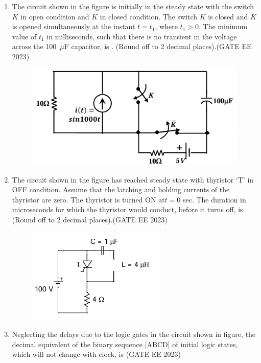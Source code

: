 \documentclass[a4paper,12pt]{exam}
\theoremstyle{remark}
\begin{document}
\begin{enumerate}
\item The circuit shown in the figure is initially in the steady state with the switch $K$ in open condition and $\overline{K}$ in closed condition. The switch $K$ is closed and $\overline{K}$ is opened simultaneously at the instant $t = t_1$, where $t_1 > 0$. The minimum value of $t_1$ in milliseconds, such that there is no transient in the voltage across the 100~$\mu$F capacitor, is \underline{\hspace{2cm}}. (Round off to 2 decimal places).\hfill{(GATE EE 2023)}
\begin{figure}[H]
    \centering
    \includegraphics[width=0.5 \columnwidth]{figs/Q 54.png}
    \caption{}
    \label{fig:placeholder}
\end{figure}
 \item The circuit shown in the figure has reached steady state with thyristor ‘T’ in OFF 
condition. Assume that the latching and holding currents of the thyristor are zero. 
The thyristor is turned ON at$ t = 0$ sec. The duration in microseconds for which the 
thyristor would conduct, before it turns off, is \underline{\hspace{2cm}}(Round off to 2 decimal 
places).\hfill{(GATE EE 2023)}
\begin{figure}[H]
    \centering
    \includegraphics[width=0.4\columnwidth]{figs/Q 55.png}
    \caption{}
    \label{fig:placeholder}
\end{figure}
\item Neglecting the delays due to the logic gates in the circuit shown in figure, the 
decimal equivalent of the binary sequence [ABCD] of initial logic states, which 
will not change with clock, is \underline{\hspace{2cm}}\hfill{(GATE EE 2023)}
\begin{figure}[H]

\end{figure}
\end{enumerate}
\end{document}
